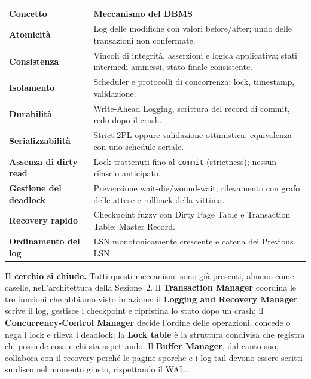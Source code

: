 \documentclass[12pt]{extarticle}
\begin{document}
\begin{center}
\small
\begin{tabular}{@{}lp{9.8cm}@{}}
    \toprule
    \textbf{Concetto} & \textbf{Meccanismo del DBMS} \\
    \midrule
    \textbf{Atomicità} & Log delle modifiche con valori before/after; undo delle transazioni non confermate. \\
    \addlinespace
    \textbf{Consistenza} & Vincoli di integrità, asserzioni e logica applicativa; stati intermedi ammessi, stato finale consistente. \\
    \addlinespace
    \textbf{Isolamento} & Scheduler e protocolli di concorrenza: lock, timestamp, validazione. \\
    \addlinespace
    \textbf{Durabilità} & Write-Ahead Logging, scrittura del record di commit, redo dopo il crash. \\
    \addlinespace
    \textbf{Serializzabilità} & Strict 2PL oppure validazione ottimistica; equivalenza con uno schedule seriale. \\
    \addlinespace
    \textbf{Assenza di dirty read} & Lock trattenuti fino al \texttt{commit} (strictness); nessun rilascio anticipato. \\
    \addlinespace
    \textbf{Gestione del deadlock} & Prevenzione wait-die/wound-wait; rilevamento con grafo delle attese e rollback della vittima. \\
    \addlinespace
    \textbf{Recovery rapido} & Checkpoint fuzzy con Dirty Page Table e Transaction Table; Master Record. \\
    \addlinespace
    \textbf{Ordinamento del log} & LSN monotonicamente crescente e catena dei Previous LSN. \\
    \bottomrule
\end{tabular}
\end{center}

\medskip
\noindent \textbf{Il cerchio si chiude.} Tutti questi meccanismi sono già presenti, almeno come caselle, nell'architettura della Sezione~2. Il \textbf{Transaction Manager} coordina le tre funzioni che abbiamo visto in azione: il \textbf{Logging and Recovery Manager} scrive il log, gestisce i checkpoint e ripristina lo stato dopo un crash; il \textbf{Concurrency-Control Manager} decide l'ordine delle operazioni, concede o nega i lock e rileva i deadlock; la \textbf{Lock table} è la struttura condivisa che registra chi possiede cosa e chi sta aspettando. Il \textbf{Buffer Manager}, dal canto suo, collabora con il recovery perché le pagine sporche e i log tail devono essere scritti su disco nel momento giusto, rispettando il WAL.
\end{document}
